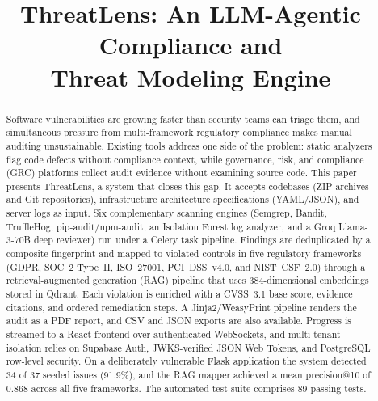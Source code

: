 \documentclass[conference]{IEEEtran}
\begin{document}
\title{ThreatLens: An LLM-Agentic Compliance and\\Threat Modeling Engine}

\author{
\and
{}
}

\maketitle

\begin{abstract}
Software vulnerabilities are growing faster than security teams can triage them,
and simultaneous pressure from multi-framework regulatory compliance makes manual
auditing unsustainable. Existing tools address one side of the problem: static
analyzers flag code defects without compliance context, while governance, risk,
and compliance (GRC) platforms collect audit evidence without examining source
code. This paper presents ThreatLens, a system that closes this gap. It accepts
codebases (ZIP archives and Git repositories), infrastructure architecture
specifications (YAML/JSON), and server logs as input. Six complementary scanning
engines (Semgrep, Bandit, TruffleHog, pip-audit/npm-audit, an Isolation Forest log
analyzer, and a Groq Llama-3-70B deep reviewer) run under a Celery task pipeline.
Findings are deduplicated by a composite fingerprint and mapped to violated
controls in five regulatory frameworks (GDPR, SOC~2 Type~II, ISO~27001,
PCI~DSS~v4.0, and NIST~CSF~2.0) through a retrieval-augmented generation (RAG)
pipeline that uses 384-dimensional embeddings stored in Qdrant. Each violation is
enriched with a CVSS~3.1 base score, evidence citations, and ordered remediation
steps. A Jinja2/WeasyPrint pipeline renders the audit as a PDF report, and CSV and
JSON exports are also available. Progress is streamed to a React frontend over
authenticated WebSockets, and multi-tenant isolation relies on Supabase Auth,
JWKS-verified JSON Web Tokens, and PostgreSQL row-level security. On a
deliberately vulnerable Flask application the system detected 34 of 37 seeded
issues (91.9\%), and the RAG mapper achieved a mean precision@10 of 0.868 across
all five frameworks. The automated test suite comprises 89 passing tests.
\end{abstract}
\end{document}
